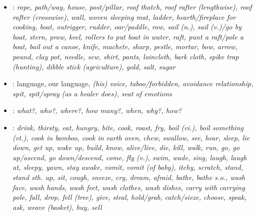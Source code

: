 \begin{itemize}
\item	{}: 
\it{rope},
\it{path/way},
\it{house},
\it{post/pillar},
\it{roof thatch},
\it{roof rafter (lengthwise)},
roof rafter (crosswise),
wall,
woven sleeping mat,
\it{ladder},
\it{hearth/fireplace for cooking},
\it{boat},
outrigger,
rudder,
\it{oar/paddle},
row,
\it{sail (n.)},
sail (v.)/go by boat,
stern,
prow,
keel,
rollers to put boat in water,
raft,
punt a raft/pole a boat,
bail out a canoe,
\it{knife},
\it{machete},
\it{sharp},
\it{pestle},
\it{mortar},
\it{bow},
\it{arrow},
\it{pound},
\it{clay pot},
\it{needle},
\it{sew},
shirt,
pants,
loincloth,
bark cloth,
\it{spike trap (hunting)},
dibble stick (agriculture),
gold,
\it{salt},
\it{sugar}

\item	{}: language,
our language,
\it{(his) voice},
taboo/forbidden,
avoidance relationship,
\it{spit},
\it{spit/spray (as a healer does)},
\it{seat of emotions}
				
\item	{}: 
\it{what?},
\it{who?},
\it{where?},
\it{how many?},
\it{when},
\it{why?},
\it{how?}

\item	{}: \it{drink},
\it{thirsty},
\it{eat},
\it{hungry},
\it{bite},
cook,
roast,
fry,
boil (vi.),
boil something (vt.),
cook in bamboo,
cook in earth oven,
chew,
swallow,
\it{see},
\it{hear},
\it{sleep},
\it{lie down},
\it{get up},
wake up,
\it{build},
\it{know},
\it{alive/live},
\it{die},
\it{kill},
\it{walk},
\it{run},
\it{go},
\it{go up/ascend},
\it{go down/descend},
\it{come},
\it{fly (v.)},
\it{swim},
\it{wade},
\it{sing},
\it{laugh},
\it{laugh at},
\it{sleepy},
yawn,
stay awake,
\it{vomit},
vomit (of baby),
\it{itchy},
scratch,
\it{stand},
stand sth. up,
\it{sit},
\it{cough},
\it{sneeze},
\it{cry},
\it{dream},
\it{afraid},
\it{bathe},
\it{bathe s.o.},
wash face,
wash hands,
wash feet,
wash clothes,
wash dishes,
\it{carry with carrying pole},
\it{fall},
\it{drop},
fell (tree),
\it{give},
\it{steal},
\it{hold/grab},
catch/sieze,
choose,
\it{speak},
\it{ask},
\it{weave (basket)},
\it{buy},
sell

\end{itemize}